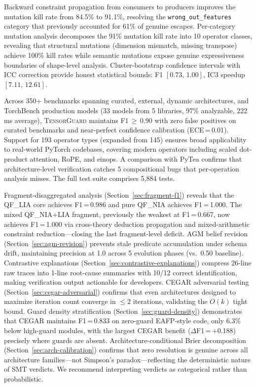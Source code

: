\documentclass[11pt]{article}
\begin{document}
Backward constraint propagation from consumers to producers improves
the mutation kill rate from 84.5\% to 91.1\%, resolving the
\texttt{wrong\_out\_features} category that previously accounted for
61\% of genuine escapes.
Per-category mutation analysis decomposes the 91\% mutation kill
rate into 10 operator classes, revealing that structural mutations
(dimension mismatch, missing transpose) achieve 100\% kill rates
while semantic mutations expose genuine expressiveness boundaries
of shape-level analysis.  Cluster-bootstrap confidence intervals
with ICC correction provide honest statistical bounds:
F1 $[0.73,\, 1.00]$, IC3 speedup $[7.11,\, 12.61]$.

Across 350+ benchmarks spanning curated, external, dynamic
architectures, and TorchBench production models (33 models from
5 libraries, 97\% analyzable, 222\,ms average),
\textsc{TensorGuard} maintains F1\,$\geq$\,0.90
with zero false positives on curated benchmarks and
near-perfect confidence calibration (ECE\,=\,0.01).
Support for 193 operator types (expanded from 145) ensures broad applicability
to real-world PyTorch codebases, covering modern operators including
scaled dot-product attention, RoPE, and einops.
A comparison with PyTea confirms that architecture-level
verification catches 5 compositional bugs that per-operation analysis
misses.  The full test suite comprises 5,884 tests.

Fragment-disaggregated analysis (Section~\ref{sec:fragment-f1})
reveals that the QF\_LIA core achieves F1\,=\,0.986 and pure
QF\_NIA achieves F1\,=\,1.000.  The mixed QF\_NIA+LIA fragment,
previously the weakest at F1\,=\,0.667, now achieves F1\,=\,1.000
via cross-theory deduction propagation and mixed-arithmetic
constraint reduction---closing the last fragment-level deficit.
AGM belief revision (Section~\ref{sec:agm-revision}) prevents
stale predicate accumulation under schema drift, maintaining
precision at 1.0 across 5 evolution phases (vs.\ 0.50 baseline).
Contrastive explanations (Section~\ref{sec:contrastive-explanations})
compress 26-line raw traces into 1-line root-cause summaries
with 10/12 correct identification, making verification output
actionable for developers.
CEGAR adversarial testing (Section~\ref{sec:cegar-adversarial})
confirms that even architectures designed to maximize iteration
count converge in $\leq 2$ iterations, validating the $O(k)$
tight bound.
Guard density stratification (Section~\ref{sec:guard-density})
demonstrates that CEGAR maintains F1\,=\,0.833 on zero-guard
EAFP-style code, only 6.3\% below high-guard modules, with
the largest CEGAR benefit ($\Delta$F1\,=\,$+$0.188) precisely
where guards are absent.
Architecture-conditional Brier decomposition
(Section~\ref{sec:arch-calibration}) confirms that zero
resolution is genuine across all architecture families---not
Simpson's paradox---reflecting the deterministic nature of
SMT verdicts.  We recommend interpreting verdicts as categorical
rather than probabilistic.
\end{document}
